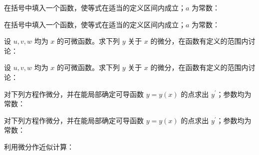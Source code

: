 \noindent\begin{minipage}{\textwidth}
在括号中填入一个函数，使等式在适当的定义区间内成立；$a$ 为常数：
\end{minipage}\par\vfill
\newpage
\noindent\begin{minipage}{\textwidth}
在括号中填入一个函数，使等式在适当的定义区间内成立；$a$ 为常数：
\end{minipage}\par\vfill
\noindent\begin{minipage}{\textwidth}
设 $u,v,w$ 均为 $x$ 的可微函数。求下列 $y$ 关于 $x$ 的微分，在函数有定义的范围内讨论：
\end{minipage}\par\vfill
\noindent\begin{minipage}{\textwidth}
设 $u,v,w$ 均为 $x$ 的可微函数。求下列 $y$ 关于 $x$ 的微分，在函数有定义的范围内讨论：
\end{minipage}\par\vfill
\newpage
\noindent\begin{minipage}{\textwidth}
对下列方程作微分，并在能局部确定可导函数 $y=y(x)$ 的点求出 $y^{\prime}$；参数均为常数：
\end{minipage}\par\vfill
\noindent\begin{minipage}{\textwidth}
对下列方程作微分，并在能局部确定可导函数 $y=y(x)$ 的点求出 $y^{\prime}$；参数均为常数：
\end{minipage}\par\vfill
\noindent\begin{minipage}{\textwidth}
利用微分作近似计算：
\end{minipage}\par\vfill
